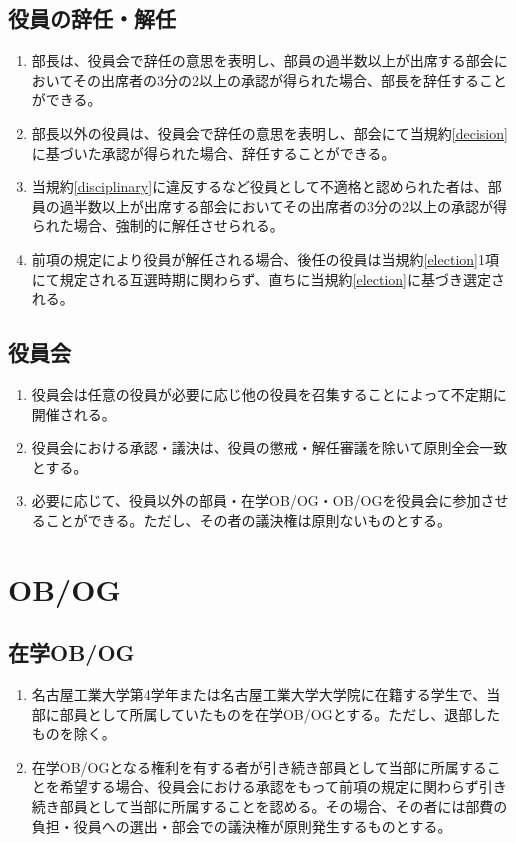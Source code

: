 \documentclass[12pt, unicode, a4paper]{ltjsreport}
\begin{document}
    \section{役員の辞任・解任}\label{resignation}
        \begin{enumerate}
            \item 部長は、役員会で辞任の意思を表明し、部員の過半数以上が出席する部会においてその出席者の3分の2以上の承認が得られた場合、部長を辞任することができる。
            \item 部長以外の役員は、役員会で辞任の意思を表明し、部会にて当規約\ref{decision}に基づいた承認が得られた場合、辞任することができる。
            \item 当規約\ref{disciplinary}に違反するなど役員として不適格と認められた者は、部員の過半数以上が出席する部会においてその出席者の3分の2以上の承認が得られた場合、強制的に解任させられる。
            \item 前項の規定により役員が解任される場合、後任の役員は当規約\ref{election}1項にて規定される互選時期に関わらず、直ちに当規約\ref{election}に基づき選定される。
        \end{enumerate}

    \section{役員会}
        \begin{enumerate}
            \item 役員会は任意の役員が必要に応じ他の役員を召集することによって不定期に開催される。
            \item 役員会における承認・議決は、役員の懲戒・解任審議を除いて原則全会一致とする。
            \item 必要に応じて、役員以外の部員・在学OB/OG・OB/OGを役員会に参加させることができる。ただし、その者の議決権は原則ないものとする。
        \end{enumerate}


\chapter{OB/OG}
    \section{在学OB/OG}
        \begin{enumerate}
            \item 名古屋工業大学第4学年または名古屋工業大学大学院に在籍する学生で、当部に部員として所属していたものを在学OB/OGとする。ただし、退部したものを除く。
            \item 在学OB/OGとなる権利を有する者が引き続き部員として当部に所属することを希望する場合、役員会における承認をもって前項の規定に関わらず引き続き部員として当部に所属することを認める。その場合、その者には部費の負担・役員への選出・部会での議決権が原則発生するものとする。
        \end{enumerate}
\end{document}
